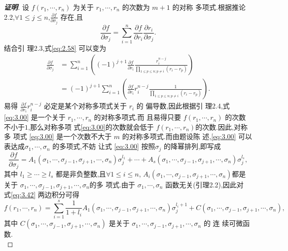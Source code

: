\documentclass[a4paper]{article}
\newcommand{\pa}{\partial} \newcommand{\Om}{\Omega}
\begin{document}
\begin{proof}[\bf{证明}]
  设 $f(r_1,\cdots,r_n)$ 为关于 $r_1,\cdots,r_n$ 的次数为 $m+1$ 的对称
  多项式.根据推论2.2,$\forall 1\leq j\leq n$,$\frac{\pa
    f}{\pa\sigma_j}$ 存在,且
  \begin{equation}\label{eq:2.58}
    \frac{\pa f}{\pa\sigma_j}=\sum_{i=1}^n\frac{\pa f}{\pa r_i}\frac{\pa r_i}{\pa\sigma_j}.
  \end{equation}
结合引
  理2.3,式\eqref{eq:2.58} 可以变为
  \begin{equation}
    \label{eq:3.00}
    \begin{split}
      \frac{\pa f}{\pa
        \sigma_j}&=\sum_{i=1}^n\left((-1)^{j+1}\frac{\pa f}{\pa r_i}\frac{r_i^{n-j}}{\prod_{1\leq
            p\leq n;p\neq
            i}(r_i-r_p)}\right)\\&=(-1)^{j+1}\sum_{i=1}^n\left(\frac{\pa
        f}{\pa r_i}r_i^{n-j}\frac{1}{\prod_{1\leq
            p\leq n;p\neq i}(r_i-r_p)} \right).
    \end{split}
  \end{equation}
易得 $\frac{\pa f}{\pa r_i}r_{i}^{n-j}$ 必定是某个对称多项式关于 $r_i$ 的
偏导数,因此根据引
  理2.4,式 \eqref{eq:3.00} 是一个关于 $r_1,\cdots,r_n$ 的对称多项式.而
  且易得只要 $f(r_1,\cdots,r_n)$ 的次数不小于$1$,那么对称多项
  式\eqref{eq:3.00}的次数就会低于 $f(r_1,\cdots,r_n)$的次数.因此,对称多
  项式 \eqref{eq:3.00} 是一个次数不大于 $m$ 的对称多项式.而由题设陈
  述,\eqref{eq:3.00} 可以表达成$\sigma_1,\cdots,\sigma_n$ 的多项式,不妨
  让式 \eqref{eq:3.00} 按照$\sigma_j$ 的降幂排列,即写成
  \begin{equation}\label{eq:3.42}
    \frac{\pa f}{\pa \sigma_j}=A_1(\sigma_1,\cdots,\sigma_{j-1},\sigma_{j+1},\cdots,\sigma_n)\sigma_j^{l_1}+\cdots+A_s(\sigma_1,\cdots,\sigma_{j-1},\sigma_{j+1},\cdots,\sigma_n)\sigma_j^{l_s},
  \end{equation}
  其中 $l_1\geq \cdots \geq l_s$ 都是非负整数,且$\forall 1\leq i\leq
  n$,
  $A_i(\sigma_1,\cdots,\sigma_{j-1},\sigma_{j+1},\cdots,\sigma_n)$都是
  关于 $\sigma_1,\cdots,\sigma_{j-1},\sigma_{j+1},\cdots,\sigma_n$的多
  项式.由于 $\sigma_1,\cdots,\sigma_n$ 函数无关(引理2.2),因此对
  式\eqref{eq:3.42} 两边积分可得
  \begin{equation}\label{eq:4.24}
    f(r_1,\cdots,r_n)=\sum_{i=1}^{s}\frac{1}{1+l_i}A_1(\sigma_1,\cdots,\sigma_{j-1},\sigma_{j+1},\cdots,\sigma_n)\sigma_j^{l_i+1}+C(\sigma_{1},\cdots,\sigma_{j-1},\sigma_{j+1},\cdots,\sigma_n),
  \end{equation}
  其中 $C(\sigma_1,\cdots,\sigma_{j-1},\sigma_{j+1},\cdots,\sigma_n)$
  是关于 $\sigma_1,\cdots,\sigma_{j-1},\sigma_{j+1},\cdots,\sigma_n$ 的
  连
  续可微函数.\\


\end{proof}
\end{document}
